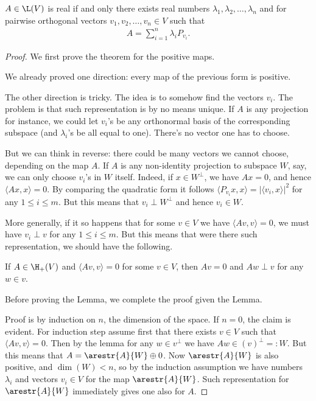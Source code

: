 \begin{lause}\label{cheapSpectral}
	$A \in \L(V)$ is real if and only there exists real numbers $\lambda_{1}, \lambda_{2}, \ldots, \lambda_{n}$ and for pairwise orthogonal vectors $v_{1}, v_{2}, \ldots, v_{n} \in V$ such that
	\begin{align}\label{spectralrepr}
		A = \sum_{i = 1}^{n} \lambda_{i} P_{v_{i}}.
	\end{align}
\end{lause}
\begin{proof}
	We first prove the theorem for the positive maps.

	We already proved one direction: every map of the previous form is positive.

	The other direction is tricky. The idea is to somehow find the vectors $v_{i}$. The problem is that such representation is by no means unique. If $A$ is any projection for instance, we could let $v_{i}$'s be any orthonormal basis of the corresponding subspace (and $\lambda_{i}$'s be all equal to one). There's no vector one has to choose.

	But we can think in reverse: there could be many vectors we cannot choose, depending on the map $A$. If $A$ is any non-identity projection to subspace $W$, say, we can only choose $v_{i}$'s in $W$ itself. Indeed, if $x \in W^{\perp}$, we have $A x = 0$, and hence $\langle A x, x \rangle = 0$. By comparing the quadratic form it follows $\langle P_{v_{i}} x, x \rangle = |\langle v_{i}, x \rangle|^{2}$ for any $1 \leq i \leq m$. But this means that $v_{i} \perp W^{\perp}$ and hence $v_{i} \in W$.

	More generally, if it so happens that for some $v \in V$ we have $\langle A v, v \rangle = 0$, we must have $v_{i} \perp v$ for any $1 \leq i \leq m$. But this means that were there such representation, we should have the following.

	\begin{lem}\label{spectral_zero_lemma}
		If $A \in \H_{+}(V)$ and $\langle A v, v \rangle = 0$ for some $v \in V$, then $A v = 0$ and $A w \perp v$ for any $w \in v$.
	\end{lem}

	Before proving the Lemma, we complete the proof given the Lemma.

	Proof is by induction on $n$, the dimension of the space. If $n = 0$, the claim is evident. For induction step assume first that there exists $v \in V$ such that $\langle A v, v \rangle = 0$. Then by the lemma for any $w \in v^{\perp}$ we have $A w \in (v)^{\perp} =: W$. But this means that $A = \arestr{A}{W} \oplus 0$. Now $\arestr{A}{W}$ is also positive, and $\dim(W) < n$, so by the induction assumption we have numbers $\lambda_{i}$ and vectors $v_{i} \in V$ for the map $\arestr{A}{W}$. Such representation for $\arestr{A}{W}$ immediately gives one also for $A$.


\end{proof}
